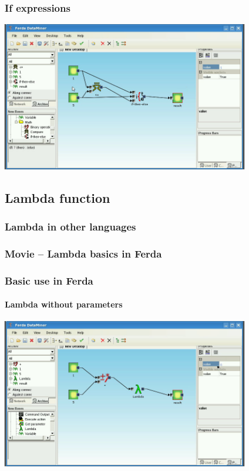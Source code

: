 \documentclass{beamer}
\begin{document}
\begin{frame}
	\frametitle{If expressions}
	\includegraphics[width=10.8cm]{ifthenelse2.png}
\end{frame}

\subsection{Lambda function}
\begin{frame}
	\frametitle{Lambda in other languages}
\end{frame}

\begin{frame}
	\frametitle{Movie -- Lambda basics in Ferda}
\end{frame}

\begin{frame}
	\frametitle{Basic use in Ferda}
	\framesubtitle{Lambda without parameters}

	\includegraphics[width=10.8cm]{lambdaBasic2.png}
\end{frame}
\end{document}
